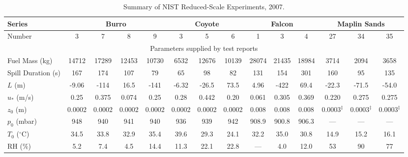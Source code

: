 \begin{sidewaystable}[p]
\caption{Summary of NIST Reduced-Scale Experiments, 2007.}
\begin{center}
\begin{tabular}{|l|c|c|c|c|c|c|c|c|c|c|c|c|c|}
\hline
Series                   & \multicolumn{4}{|c|}{Burro}       & \multicolumn{3}{|c|}{Coyote}  & \multicolumn{3}{|c|}{Falcon}                  & \multicolumn{3}{|c|}{Maplin Sands}          \\ \hline
Number                   & 3      & 7      & 8      & 9      &  3     & 5      & 6           &  1          & 3           & 4                 &  27             & 34             & 35      \\ \hline \hline
\multicolumn{14}{|c|}{Parameters supplied by test reports} \\ \hline
Fuel Mass (kg)           & 14712  & 17289  & 12453  & 10730  & 6532   & 12676  & 10139       & 28074       & 21435       & 18984             & 3714            & 2094           & 3658    \\ \hline
Spill Duration (s)       & 167    & 174    & 107    & 79     & 65     & 98     & 82          & 131         & 154         & 301               & 160             & 95             & 135     \\ \hline
$L$ (m)                  & -9.06  & -114   & 16.5   & -141   & -6.32  & -26.5  & 73.5        & 4.96        & -422        & 69.4              & -22.3           & -71.5          & -54.0   \\ \hline
$u_*$ (m/s)              & 0.25   & 0.375  & 0.074  & 0.25   & 0.28   & 0.442  & 0.20        & 0.061       & 0.305       & 0.369             & 0.220           & 0.275          & 0.275   \\ \hline
$z_0$ (m)                & 0.0002 & 0.0002 & 0.0002 & 0.0002 & 0.0002 & 0.0002 & 0.0002      & 0.008       & 0.008       & 0.008             & 0.0003$^\ddag$  & 0.0003$^\ddag$ & 0.0003$^\ddag$  \\ \hline
$p_0$ (mbar)             & 948    & 940    & 941    & 940    & 936    & 939    & 942         & 908.9       & 900.8       & 906.3             & ---             & ---            & ---     \\ \hline
$T_0$ ($^\circ$C)        & 34.5   & 33.8   & 32.9   & 35.4   & 39.6   & 29.3   & 24.1        & 32.2        & 35.0        & 30.8              & 14.9            & 15.2           & 16.1    \\ \hline
RH (\%)                  & 5.2    & 7.4    & 4.5    & 14.4   & 11.3   & 22.1   & 22.8        & ---         & 4.0         & 12.0              & 53              & 90             & 77      \\ \hline

\end{tabular}
\end{center}
\end{sidewaystable}
